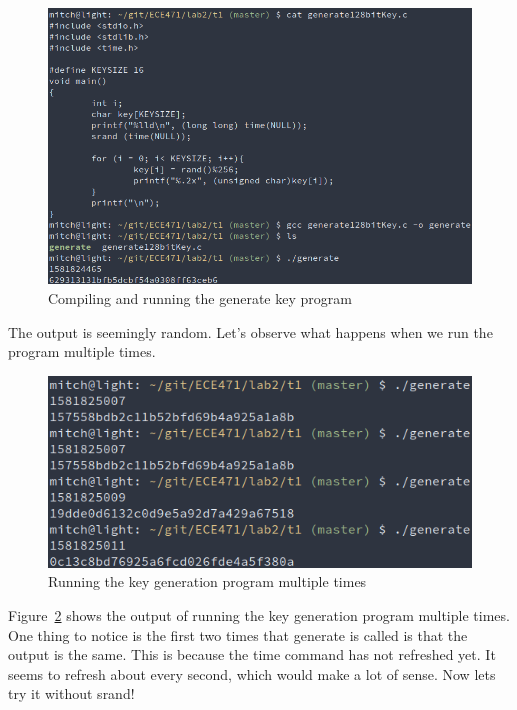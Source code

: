 \documentclass[12pt]{article}
\begin{document}
\begin{figure}[H]
    \begin{center}
        \includegraphics[scale=0.6]{t1p0.png}
    \end{center}{}
    \caption{Compiling and running the generate key program}
    \label{fig:t1p0}
\end{figure}

The output is seemingly random. Let's observe what happens when we run the program multiple times.

\begin{figure}[H]
    \begin{center}
        \includegraphics[scale=0.6]{t1p1.png}
    \end{center}{}
    \caption{Running the key generation program multiple times}
    \label{fig:t1p1}
\end{figure}

Figure~\ref{fig:t1p1} shows the output of running the key generation program multiple times. One thing to notice is the first two times that generate is called is that the output is the same. This is because the time command has not refreshed yet. It seems to refresh about every second, which would make a lot of sense. Now lets try it without srand!
\end{document}
